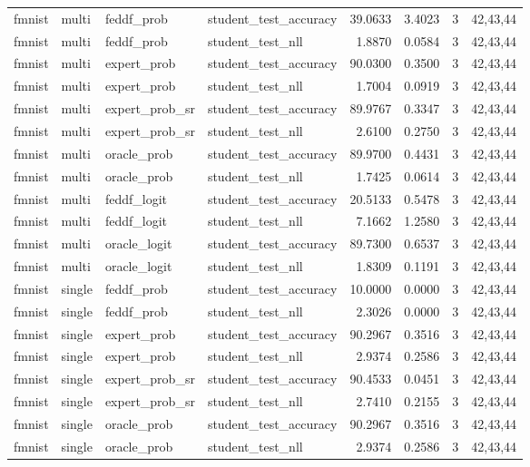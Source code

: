 \begin{tabular}{llllrrrl}
fmnist & multi & feddf\_prob & student\_test\_accuracy & 39.0633 & 3.4023 & 3 & 42,43,44 \\
fmnist & multi & feddf\_prob & student\_test\_nll & 1.8870 & 0.0584 & 3 & 42,43,44 \\
fmnist & multi & expert\_prob & student\_test\_accuracy & 90.0300 & 0.3500 & 3 & 42,43,44 \\
fmnist & multi & expert\_prob & student\_test\_nll & 1.7004 & 0.0919 & 3 & 42,43,44 \\
fmnist & multi & expert\_prob\_sr & student\_test\_accuracy & 89.9767 & 0.3347 & 3 & 42,43,44 \\
fmnist & multi & expert\_prob\_sr & student\_test\_nll & 2.6100 & 0.2750 & 3 & 42,43,44 \\
fmnist & multi & oracle\_prob & student\_test\_accuracy & 89.9700 & 0.4431 & 3 & 42,43,44 \\
fmnist & multi & oracle\_prob & student\_test\_nll & 1.7425 & 0.0614 & 3 & 42,43,44 \\
fmnist & multi & feddf\_logit & student\_test\_accuracy & 20.5133 & 0.5478 & 3 & 42,43,44 \\
fmnist & multi & feddf\_logit & student\_test\_nll & 7.1662 & 1.2580 & 3 & 42,43,44 \\
fmnist & multi & oracle\_logit & student\_test\_accuracy & 89.7300 & 0.6537 & 3 & 42,43,44 \\
fmnist & multi & oracle\_logit & student\_test\_nll & 1.8309 & 0.1191 & 3 & 42,43,44 \\
fmnist & single & feddf\_prob & student\_test\_accuracy & 10.0000 & 0.0000 & 3 & 42,43,44 \\
fmnist & single & feddf\_prob & student\_test\_nll & 2.3026 & 0.0000 & 3 & 42,43,44 \\
fmnist & single & expert\_prob & student\_test\_accuracy & 90.2967 & 0.3516 & 3 & 42,43,44 \\
fmnist & single & expert\_prob & student\_test\_nll & 2.9374 & 0.2586 & 3 & 42,43,44 \\
fmnist & single & expert\_prob\_sr & student\_test\_accuracy & 90.4533 & 0.0451 & 3 & 42,43,44 \\
fmnist & single & expert\_prob\_sr & student\_test\_nll & 2.7410 & 0.2155 & 3 & 42,43,44 \\
fmnist & single & oracle\_prob & student\_test\_accuracy & 90.2967 & 0.3516 & 3 & 42,43,44 \\
fmnist & single & oracle\_prob & student\_test\_nll & 2.9374 & 0.2586 & 3 & 42,43,44 \\

\end{tabular}
